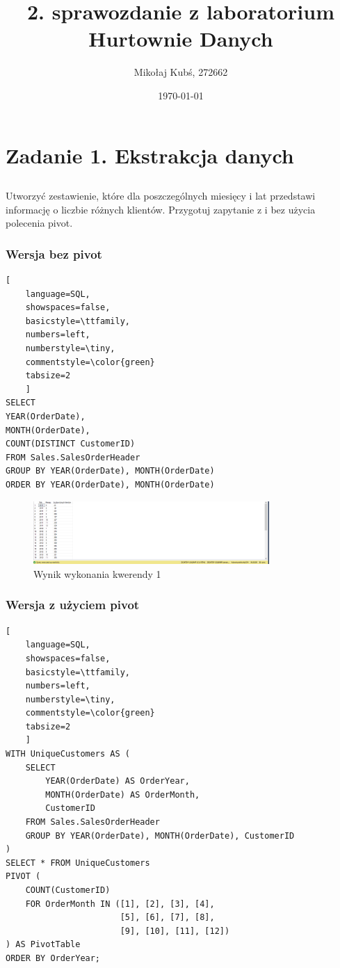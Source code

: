 \documentclass[a4paper,12pt]{article}
\title{2. sprawozdanie z laboratorium Hurtownie Danych}
\author{Mikołaj Kubś, 272662}
\date{\today}
\begin{document}
\maketitle

\section{Zadanie 1. Ekstrakcja danych}

\subsection{}

Utworzyć zestawienie, które dla poszczególnych miesięcy i lat przedstawi informację o liczbie różnych klientów. Przygotuj zapytanie z i bez użycia polecenia pivot.

\subsubsection{Wersja bez pivot}

\begin{lstlisting}[
    language=SQL,
    showspaces=false,
    basicstyle=\ttfamily,
    numbers=left,
    numberstyle=\tiny,
    commentstyle=\color{green}
    tabsize=2
    ]
SELECT 
YEAR(OrderDate), 
MONTH(OrderDate), 
COUNT(DISTINCT CustomerID) 
FROM Sales.SalesOrderHeader
GROUP BY YEAR(OrderDate), MONTH(OrderDate)
ORDER BY YEAR(OrderDate), MONTH(OrderDate)
\end{lstlisting}

\begin{figure}[H]
    \centering
    \includegraphics[width=0.8\textwidth]{images/01_normal.png}
    \caption{Wynik wykonania kwerendy 1}
    \label{fig:1_normal}
\end{figure}

\subsubsection{Wersja z użyciem pivot}

\begin{lstlisting}[
    language=SQL,
    showspaces=false,
    basicstyle=\ttfamily,
    numbers=left,
    numberstyle=\tiny,
    commentstyle=\color{green}
    tabsize=2
    ]
WITH UniqueCustomers AS (
    SELECT 
        YEAR(OrderDate) AS OrderYear, 
        MONTH(OrderDate) AS OrderMonth, 
        CustomerID
    FROM Sales.SalesOrderHeader
    GROUP BY YEAR(OrderDate), MONTH(OrderDate), CustomerID
)
SELECT * FROM UniqueCustomers
PIVOT (
    COUNT(CustomerID) 
    FOR OrderMonth IN ([1], [2], [3], [4], 
                       [5], [6], [7], [8], 
                       [9], [10], [11], [12])
) AS PivotTable
ORDER BY OrderYear;
\end{lstlisting}
\end{document}
